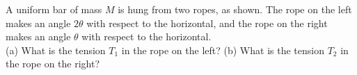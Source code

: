 A uniform bar of mass $M$ is hung from two ropes, as
shown. The rope on the left makes an angle
$2\theta$ with respect to the horizontal, and the rope on the right
makes an angle $\theta$ with respect to the
horizontal.\\
%
(a) What is the tension $T_1$ in the rope on the left?\answercheck\hwendpart
%
(b) What is the tension $T_2$ in the rope on the right?\answercheck
